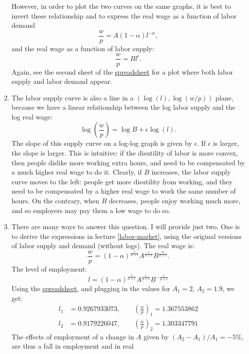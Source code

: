 \documentclass[]{book}
\begin{document}
\begin{enumerate}
  However, in order to plot the two curves on the same graphs, it is
  best to invert these relationship and to express the real wage as a
  function of labor demand \[\frac{w}{p}=A (1-\alpha)l^{-\alpha},\] and
  the real wage as a function of labor supply:
  \[\frac{w}{p}=B l^{\epsilon}.\] Again, see the second sheet of the
  \href{https://docs.google.com/spreadsheets/d/1h9JJD8K2_IE166gdj78waf0zu4YDY9Rp3r5oiJR_06s/edit?usp=sharing}{spreadsheet}
  for a plot where both labor supply and labor demand appear.
\item
  The labor supply curve is also a line in a \((\log(l), \log(w/p))\)
  plane, because we have a linear relationship between the log labor
  supply and the log real wage:
  \[\boxed{\log\left(\frac{w}{p}\right)=\log B + \epsilon \log(l)}.\]
  The slope of this supply curve on a log-log graph is given by
  \(\epsilon\). If \(\epsilon\) is larger, the slope is larger. This is
  intuitive: if the disutility of labor is more convex, then people
  dislike more working extra hours, and need to be compensated by a much
  higher real wage to do it. Clearly, if \(B\) increases, the labor
  supply curve moves to the left: people get more disutility from
  working, and they need to be compensated by a higher real wage to work
  the same number of hours. On the contrary, when \(B\) decreases,
  people enjoy working much more, and so employers may pay them a low
  wage to do so.
\item
  There are many ways to answer this question. I will provide just two.
  One is to derive the expressions in lecture \ref{labor-market}, using
  the original versions of labor supply and demand (without logs). The
  real wage is:
  \[\frac{w}{p} = (1-\alpha)^{\frac{\epsilon}{\alpha+\epsilon}}A^{\frac{\epsilon}{\alpha+\epsilon}} B^{\frac{\alpha}{\alpha+\epsilon}}.\]
  The level of employment:
  \[l= (1-\alpha)^{\frac{1}{\alpha+\epsilon}}A^{\frac{1}{\alpha+\epsilon}} B^{-\frac{1}{\alpha+\epsilon}}\]
  Using the
  \href{https://docs.google.com/spreadsheets/d/1h9JJD8K2_IE166gdj78waf0zu4YDY9Rp3r5oiJR_06s/edit?usp=sharing}{spreadsheet},
  and plugging in the values for \(A_1 = 2\), \(A_2 = 1.9\), we get: \[
  \begin{aligned}
  l_1 &=0.9267933073, \qquad \left(\frac{w}{p}\right)_1=1.367553862\\
  l_2 &=0.9179226047, \qquad \left(\frac{w}{p}\right)_2=1.303347791
  \end{aligned}
  \] The effects of employment of a change in \(A\) given by
  \((A_2-A_1)/A_1=-5\%\), are thus a fall in employment and in real

\end{enumerate}
\end{document}
